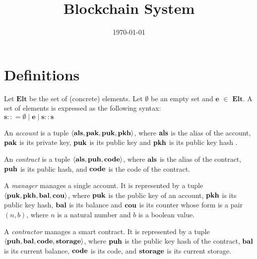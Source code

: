 \documentclass[a4paper]{llncs}
\title{Blockchain System}
\author{}
\institute{}
\date{\today}
\begin{document}
\maketitle
\pagestyle{plain}

\section{Definitions}
\begin{definition}%
Let $\mathbf{Elt}$ be the set of (concrete) elements. Let $\emptyset$ be an empty set and $\mathbf{e}$ $\in$  $\mathbf{Elt}$. A set of elements is expressed as the following syntax:
\\
$\mathbf{s} :: = \emptyset \mid \mathbf{e} \mid \mathbf{s :: s}$
\end{definition}

\begin{definition}%
An \emph{account} is a tuple $\langle \textbf{als}, \textbf{pak}, \textbf{puk}, \textbf{pkh} \rangle $, where $\textbf{als}$ is the alias of the account, $\textbf{pak}$ is its private key, $\textbf{puk}$ is its public key and $\textbf{pkh}$ is its public key hash . 
\end{definition}

\begin{definition}%
An \emph{contract} is a tuple $\langle  \textbf{als}, \textbf{puh}, \textbf{code} \rangle $, where
$\textbf{als}$ is the alias of the contract, $\textbf{puh}$ is its public hash, and
$\textbf{code}$ is the code of the contract. 
\end{definition}

\begin{definition}%
A \emph{manager} manages a single account. It is represented by a
tuple $\langle  \textbf{puk}, \textbf{pkh}, \textbf{bal}, \textbf{cou} \rangle $, where  $\textbf{puk}$ is the
public key of an account, $\textbf{pkh}$ is its public key hash, $\textbf{bal}$ is its
balance and $\textbf{cou}$ is its counter whose form is a pair $(n, b)$, where $n$ is a natural number and ${b}$
is a boolean value.  
\end{definition}

\begin{definition}%
  A \emph{contractor} manages a smart contract. It is
  represented by a tuple
  $\langle \textbf{puh}, \textbf{bal}, \textbf{code}, \textbf{storage} \rangle $, where $\textbf{puh}$ is the
  public key hash of the contract, $\textbf{bal}$ is its current balance, $\textbf{code}$ is its
  code, and $\textbf{storage}$ is its current storage.
\end{definition}
\end{document}
